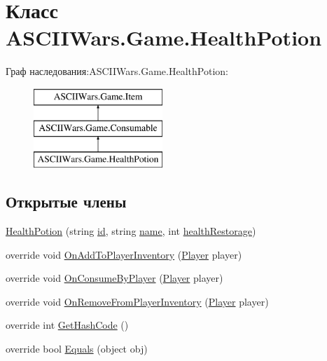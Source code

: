 \hypertarget{class_a_s_c_i_i_wars_1_1_game_1_1_health_potion}{}\section{Класс A\+S\+C\+I\+I\+Wars.\+Game.\+Health\+Potion}
\label{class_a_s_c_i_i_wars_1_1_game_1_1_health_potion}
Граф наследования\+:A\+S\+C\+I\+I\+Wars.\+Game.\+Health\+Potion\+:\begin{figure}[H]
\begin{center}
\leavevmode
\includegraphics[height=3.000000cm]{class_a_s_c_i_i_wars_1_1_game_1_1_health_potion}
\end{center}
\end{figure}
\subsection*{Открытые члены}
\begin{DoxyCompactItemize}
\item 
\hyperlink{class_a_s_c_i_i_wars_1_1_game_1_1_health_potion_a8f1763067ff0af22657b7447fe96cc66}{Health\+Potion} (string \hyperlink{class_a_s_c_i_i_wars_1_1_game_1_1_item_a744d51f7684a4e46a1f834f8666db58e}{id}, string \hyperlink{class_a_s_c_i_i_wars_1_1_game_1_1_item_a994b9ec5f10c123e4345da159c090091}{name}, int \hyperlink{class_a_s_c_i_i_wars_1_1_game_1_1_health_potion_aa337067f250678b0825d86fc3e2868c5}{health\+Restorage})
\item 
override void \hyperlink{class_a_s_c_i_i_wars_1_1_game_1_1_health_potion_aecf685e26442760c13e59f294ce7a5e7}{On\+Add\+To\+Player\+Inventory} (\hyperlink{class_a_s_c_i_i_wars_1_1_game_1_1_player}{Player} player)
\item 
override void \hyperlink{class_a_s_c_i_i_wars_1_1_game_1_1_health_potion_a3004d1c2396e9c068ed4e03884afd56c}{On\+Consume\+By\+Player} (\hyperlink{class_a_s_c_i_i_wars_1_1_game_1_1_player}{Player} player)
\item 
override void \hyperlink{class_a_s_c_i_i_wars_1_1_game_1_1_health_potion_ad708f58b7d3cbc69945cb2ccb0328f78}{On\+Remove\+From\+Player\+Inventory} (\hyperlink{class_a_s_c_i_i_wars_1_1_game_1_1_player}{Player} player)
\item 
override int \hyperlink{class_a_s_c_i_i_wars_1_1_game_1_1_health_potion_a825fcf689ad6dd4fcf48069980f8c176}{Get\+Hash\+Code} ()
\item 
override bool \hyperlink{class_a_s_c_i_i_wars_1_1_game_1_1_health_potion_a84ed6d197746ebb5a33a61b2b2e46fb9}{Equals} (object obj)
\end{DoxyCompactItemize}
